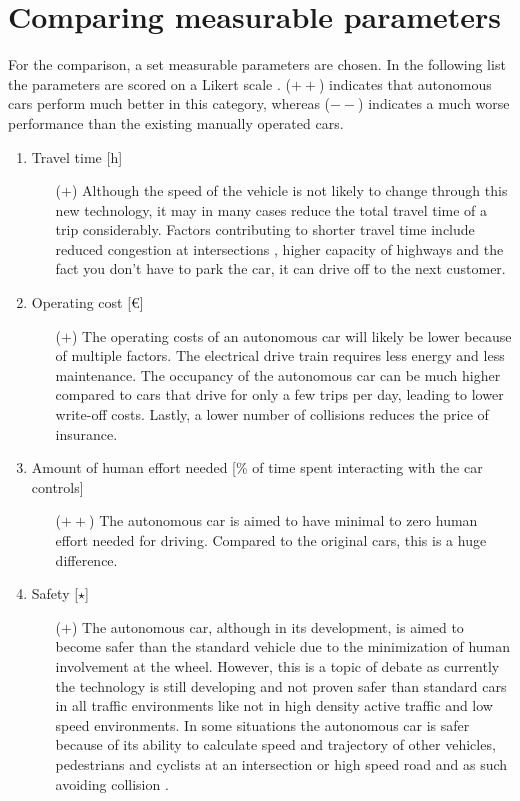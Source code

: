 \documentclass[a4paper]{article}
\begin{document}
\section{Comparing measurable parameters}
\label{sec:comparing}

For the comparison, a set measurable parameters are chosen. In the following list the parameters are scored on a Likert scale \cite{likert}. ($++$) indicates that autonomous cars perform much better in this category, whereas ($--$) indicates a much worse performance than the existing manually operated cars.

\begin{enumerate}
\item Travel time [h]
    \begin{enumerate}
    \item[($+$)] Although the speed of the vehicle is not likely to change through this new technology, it may in many cases reduce the total travel time of a trip considerably. Factors contributing to shorter travel time include reduced congestion at intersections \cite{IROS12-chiu}, higher capacity of highways \cite{GONG201825} and the fact you don't have to park the car, it can drive off to the next customer.
    \end{enumerate}
\item Operating cost [€]
    \begin{enumerate}
    \item[($+$)] The operating costs of an autonomous car will likely be lower because of multiple factors. The electrical drive train requires less energy and less maintenance. The occupancy of the autonomous car can be much higher compared to cars that drive for only a few trips per day, leading to lower write-off costs. Lastly, a lower number of collisions reduces the price of insurance.
    \end{enumerate}
\item Amount of human effort needed [\% of time spent interacting with the car controls]
    \begin{enumerate}
    \item[($++$)] The autonomous car is aimed to have minimal to zero human effort needed for driving. Compared to the original cars, this is a huge difference.
    \end{enumerate}
\item Safety [$\star$]
    \begin{enumerate}
    \item[($+$)] The autonomous car, although in its development, is aimed to become safer than the standard vehicle due to the minimization of human involvement at the wheel. However, this is a topic of debate as currently the technology is still developing and not proven safer than standard cars in all traffic environments like not in high density active traffic and low speed environments. In some situations the autonomous car is safer because of its ability to calculate speed and trajectory of other vehicles, pedestrians and cyclists at an intersection or high speed road and as such avoiding collision \cite{FU2018188}.

\end{enumerate}
\end{enumerate}
\end{document}

